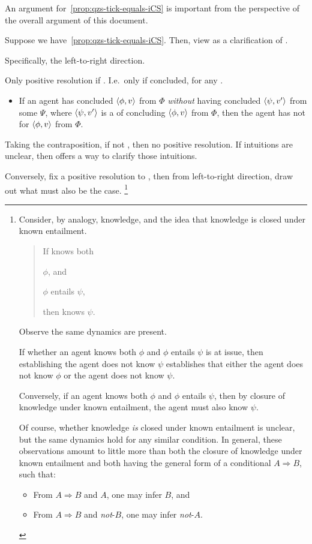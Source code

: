 \begin{note}
  An argument for~\autoref{prop:qzs-tick-equals-iCS} is important from the perspective of the overall argument of this document.

  Suppose we have~\autoref{prop:qzs-tick-equals-iCS}.
  Then, view \iCS{} as a clarification of \qzs{}.

  Specifically, the left-to-right direction.

  Only positive resolution if \iCS{}.
  I.e.\ only if concluded, for any \requ{}.

  \begin{itemize}
  \item
    If an agent has concluded \(\langle \phi, v \rangle\) from \(\Phi\) \emph{without} having concluded \(\langle \psi, v' \rangle\) from some \(\Psi\), where \(\langle \psi, v' \rangle\) is a \requ{} of concluding \(\langle \phi, v \rangle\) from \(\Phi\), then the agent has not \csVed{} for \(\langle \phi, v \rangle\) from \(\Phi\).
  \end{itemize}

  Taking the contraposition, if not \iCS{}, then no positive resolution.
  If intuitions are unclear, then \iCS{} offers a way to clarify those intuitions.

  Conversely, fix a positive resolution to \qzs{}, then from left-to-right direction, draw out what must also be the case.%
  \footnote{
    Consider, by analogy, knowledge, and the idea that knowledge is closed under known entailment.
    \begin{quote}
      If \vAgent{} knows both
      \begin{enumerate*}[label=(\roman*)]
      \item \(\phi\), and
      \item \(\phi\) entails \(\psi\),
      \end{enumerate*}
      then \vAgent{} knows \(\psi\).
    \end{quote}
    Observe the same dynamics are present.

    If whether an agent knows both \(\phi\) and \(\phi\) entails \(\psi\) is at issue, then establishing the agent does not know \(\psi\) establishes that either the agent does not know \(\phi\) or the agent does not know \(\psi\).

    Conversely, if an agent knows both \(\phi\) and \(\phi\) entails \(\psi\), then by closure of knowledge under known entailment, the agent must also know \(\psi\).

    Of course, whether knowledge \emph{is} closed under known entailment is unclear, but the same dynamics hold for any similar condition.
    In general, these observations amount to little more than both the closure of knowledge under known entailment and \iCS{} both having the general form of a conditional \(A \Rightarrow B\), such that:
    \begin{itemize}
    \item
      From \(A \Rightarrow B\) and \(A\), one may infer \(B\), and
    \item
      From \(A \Rightarrow B\) and \emph{not}-\(B\), one may infer \emph{not}-\(A\).
    \end{itemize}
  }


\end{note}
